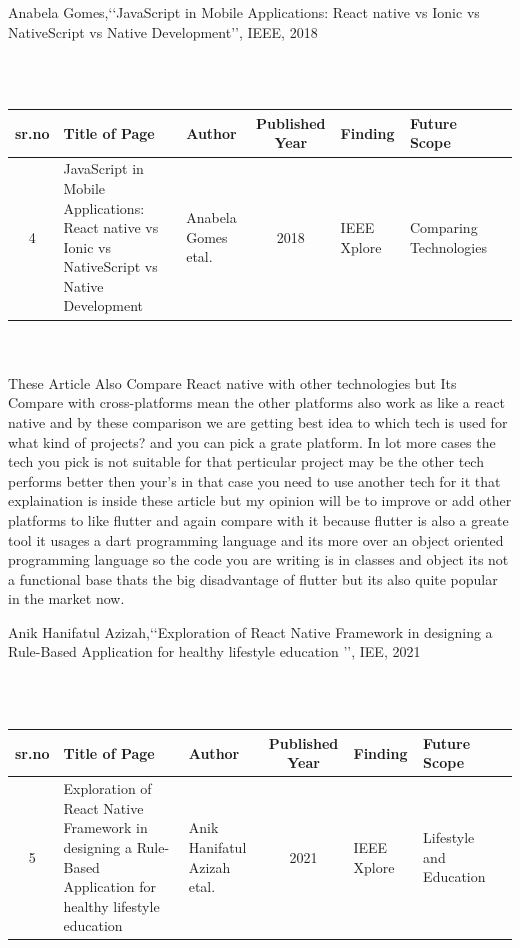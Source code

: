 \documentclass[12pt,a4paper]{report}
\begin{document}
\begin{enumerate}
{\bf\item Anabela Gomes,\lq\lq JavaScript in Mobile Applications: React native vs Ionic vs NativeScript vs Native Development\rq\rq, IEEE, 2018}
\\
\\
\begin{tabular}{ |c | m{2.5cm} | m{2cm}| c | m{2cm} | m{2cm} | c | }

  \hline
  sr.no & Title of Page & Author & Published Year & Finding & Future Scope  \\ 
  \hline
 4 &  JavaScript in Mobile Applications: React native vs Ionic vs NativeScript vs Native Development & Anabela Gomes etal. &  2018 & IEEE Xplore & Comparing Technologies \\
\hline 
  
\end{tabular}
\\
\\
 These Article Also Compare React native with other technologies but Its Compare with cross-platforms mean the other platforms also work as like a react native and by these comparison we are getting best idea to which tech is used for what kind of projects? and you can pick a grate platform. In lot more cases the tech you pick is not suitable for that perticular project may be the other tech performs better then your's in that case you need to use another tech for it that explaination is inside these article but my opinion will be to improve or add other platforms to like flutter and again compare with it because flutter is also a greate tool it usages a dart programming language and its more over an object oriented programming language  so the code you are writing is in classes and object its not a functional base thats the big disadvantage of flutter but its also quite popular in the market now.
\newpage

{\bf\item Anik Hanifatul Azizah,\lq\lq Exploration of React Native Framework in designing a Rule-Based Application for healthy lifestyle education \rq\rq, IEE, 2021}
\\
\\
\begin{tabular}{ |c | m{2.5cm} | m{2cm}| c | m{2cm} | m{2cm} | c | }

  \hline
  sr.no & Title of Page & Author & Published Year & Finding & Future Scope  \\ 
  \hline
 5 &  Exploration of React Native Framework in designing a Rule-Based Application for healthy lifestyle education & Anik Hanifatul Azizah etal. &  2021 & IEEE Xplore & Lifestyle and Education \\
\hline 
  

\end{tabular}
\end{enumerate}
\end{document}
